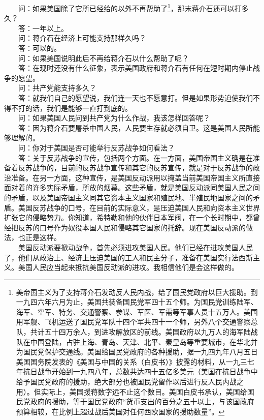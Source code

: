 \documentclass[cn,11pt,chinese]{elegantbook}
\begin{document}
　　问：如果美国除了它所已经给的以外不再帮助了\footnote[2]{ 美帝国主义为了支持蒋介石发动反人民内战，给了国民党政府以巨大援助。到一九四六年六月为止，美国共装备国民党军四十五个师。为国民党训练陆军、海军、空军、特务、交通警察、参谋、军医、军需等军事人员十五万人。美国用军舰、飞机运送了国民党军队十四个军共四十一个师，另外八个交通警察总队，共计五十四万余人，到进攻解放区的前线。美国政府以九万人的海军陆战队在中国登陆，占驻上海、青岛、天津、北平、秦皇岛等重要城市，在华北并为国民党保护交通线。美国给国民党政府的各种援助，据一九四九年八月五日美国国务院发表的《美国与中国的关系（白皮书）》披露的材料，从一九三七年抗日战争开始到一九四八年，总数共达四十五亿多美元（美国在抗日战争中给予国民党政府的援助，绝大部分也被国民党留作以后进行反人民内战之用）。但实际上，美国援蒋数字远不止这个数目。美国白皮书承认，美国给国民党政府的援助，等于国民党政府“货币支出的百分之五十以上，与该国政府预算相较，在比例上超过战后美国对任何西欧国家的援助数量”。}，那末蒋介石还可以打多久？\\
　　答：一年以上。\\
　　问：蒋介石在经济上可能支持那样久吗？\\
　　答：可以的。\\
　　问：如果美国说明此后不再给蒋介石以什么帮助了呢？\\
　　答：在现时还没有什么征象，表示美国政府和蒋介石有任何在短时期内停止战争的愿望。\\
　　问：共产党能支持多久？\\
　　答：就我们自己的愿望说，我们连一天也不愿意打。但是如果形势迫使我们不得不打的话，我们是能够一直打到底的。\\
　　问：如果美国人民问到共产党为什么作战，我该怎样回答呢？\\
　　答：因为蒋介石要屠杀中国人民，人民要生存就必须自卫。这是美国人民所能够理解的。\\
　　问：你对于美国是否可能举行反苏战争如何看法？\\
　　答：关于反苏战争的宣传，包括两个方面。在一方面，美国帝国主义确是在准备着反苏战争的，目前的反苏战争宣传和其它的反苏宣传，就是对于反苏战争的政治准备。在另一方面，这种宣传，是美国反动派用以掩盖当前美国帝国主义所直接面对着的许多实际矛盾，所放的烟幕。这些矛盾，就是美国反动派同美国人民之间的矛盾，以及美国帝国主义同其它资本主义国家和殖民地、半殖民地国家之间的矛盾。美国反苏战争的口号，在目前的实际意义，是压迫美国人民和向资本主义世界扩张它的侵略势力。你知道，希特勒和他的伙伴日本军阀，在一个长时期中，都曾经把反苏的口号作为奴役本国人民和侵略其它国家的托辞。现在美国反动派的做法，也正是这样。\\
　　美国反动派要掀动战争，首先必须进攻美国人民。他们已经在进攻美国人民了，他们从政治上、经济上压迫美国的工人和民主分子，准备在美国实行法西斯主义。美国人民应当起来抵抗美国反动派的进攻。我相信他们是会这样做的。\\
\end{document}
